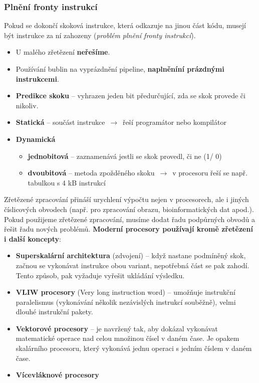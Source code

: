 \subsubsection{Plnění fronty instrukcí}
Pokud se dokončí skoková instrukce, která odkazuje na jinou část kódu, musejí být instrukce za ní zahozeny (\textit{problém plnění fronty instrukcí}).
\begin{itemize}
	\item{U malého zřetězení \textbf{neřešíme}}.
	\item{Používání bublin na vyprázdnění pipeline, \textbf{naplněníní prázdnými instrukcemi}}.
	\item{\textbf{Predikce skoku} -- vyhrazen jeden bit předurčující, zda se skok provede či nikoliv}.
\end{itemize}
\begin{itemize}
	\item{\textbf{Statická} -- součást instrukce $\,\to\,$ řeší programátor nebo kompilátor}
	\item{\textbf{Dynamická} 
			\begin{itemize}
					\item{\textbf{jednobitová} -- zaznamenává jestli se skok provedl, či ne (1/ 0)}
					\item{\textbf{dvoubitová} -- metoda zpožděného skoku $\,\to\,$ v procesoru řeší se např. tabulkou s 4 kB instrukcí}
			\end{itemize}
		}
\end{itemize}
Zřetězené zpracování přináší urychlení výpočtu nejen v procesorech, ale i jiných číslicových obvodech (např. pro zpracování obrazu, bioinformatických dat apod.). Pokud použijeme zřetězené zpracování, musíme dodat řadu podpůrných obvodů a řešit řadu nových problémů. \textbf{Moderní procesory používají kromě zřetězení i další koncepty}:
\begin{itemize}
	\item{\textbf{Superskalární architektura} (zdvojení) -- když nastane podmíněný skok, začnou se vykonávat instrukce obou variant, nepotřebná část se pak zahodí. Tento způsob, pak vyžaduje vyřešit ukládání výsledku.}
	\item{\textbf{VLIW procesory} (Very long instruction word) -- umožňuje instrukční paralelismus (vykonávání několik nezávislých instrukcí souběžně), velmi dlouhé instrukční pakety}.
	\item{\textbf{Vektorové procesory} -- je navržený tak, aby dokázal vykonávat matematické operace nad celou množinou čísel v daném čase. Je opakem skalárního procesoru, který vykonává jednu operaci s jedním číslem v daném čase. }
	\item{\textbf{Vícevláknové procesory} }
\end{itemize}
